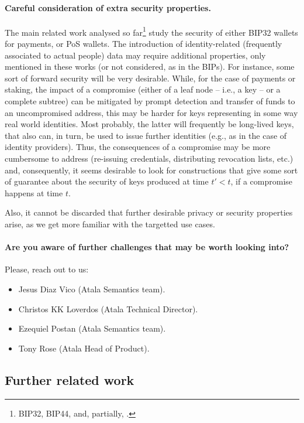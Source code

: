 \paragraph{Careful consideration of extra security properties.} %
The main related work analysed so far\footnote{BIP32, BIP44, \cite{def+21}
  and, partially, \cite{kkl20}.} study the security of either BIP32
wallets for payments, or PoS wallets. The introduction of identity-related
(frequently associated to actual people) data may require additional properties,
only mentioned in these works (or not considered, as in the BIPs). For instance,
some sort of forward security will be very desirable. While, for the case of
payments or staking, the impact of a compromise (either of a leaf node --
i.e., a key -- or a complete subtree) can be mitigated by prompt detection
and transfer of funds to an uncompromised address, this may be harder for
keys representing in some way real world identities. Most probably, the
latter will frequently be long-lived keys, that also can, in turn, be used
to issue further identities (e.g., as in the case of identity providers).
Thus, the consequences of a compromise may be more cumbersome to address
(re-issuing credentials, distributing revocation lists, etc.) and,
consequently, it seems desirable to look for constructions that give some
sort of guarantee about the security of keys produced at time $t' < t$, if a
compromise happens at time $t$.

Also, it cannot be discarded that further desirable privacy or security
properties arise, as we get more familiar with the targetted use cases.

\paragraph{Are you aware of further challenges that may be worth
  looking into?} Please, reach out to us:

\begin{itemize}
\item Jesus Diaz Vico (Atala Semantics team).
\item Christos KK Loverdos (Atala Technical Director).
\item Ezequiel Postan (Atala Semantics team).
\item Tony Rose (Atala Head of Product).
\end{itemize}

  
\subsection{Further related work}

